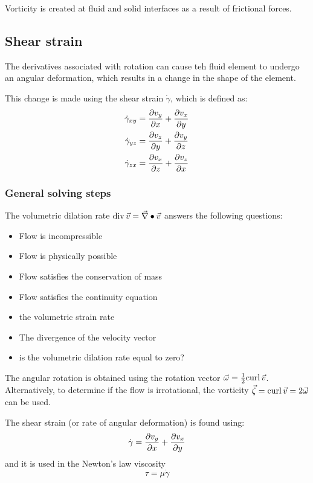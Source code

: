 \documentclass[10pt, twocolumn]{article}
\begin{document}
\begin{remark}
  Vorticity is created at fluid and solid interfaces as a result of frictional forces.
\end{remark}


\subsection{Shear strain}
The derivatives associated with rotation can cause teh fluid element to undergo an angular deformation, which results in a change in the shape of the element.

This change is made using the shear strain \(\dot{\gamma}\), which is defined as:
\begin{align*}
  \dot{\gamma}_{xy} & = \frac{\partial v_y}{\partial x} + \frac{\partial v_x}{\partial y} \\
  \dot{\gamma}_{yz} & = \frac{\partial v_z}{\partial y} + \frac{\partial v_y}{\partial z} \\
  \dot{\gamma}_{zx} & = \frac{\partial v_x}{\partial z} + \frac{\partial v_z}{\partial x}
\end{align*}


\subsubsection{General solving steps}
The volumetric dilation rate \(\mathrm{div}\,\vec{v} = \vec{\nabla} \bullet \vec{v}\) answers the following questions:
\begin{itemize}
  \item Flow is incompressible
  \item Flow is physically possible
  \item Flow satisfies the conservation of mass
  \item Flow satisfies the continuity equation
  \item the volumetric strain rate
  \item The divergence of the velocity vector
  \item is the volumetric dilation rate equal to zero?
\end{itemize}

The angular rotation is obtained using the rotation vector \(\vec{\omega} = \frac{1}{2} \mathrm{curl}\,\vec{v}\).
Alternatively, to determine if the flow is irrotational, the vorticity \(\vec{\zeta} = \mathrm{curl}\,\vec{v} = 2 \vec{\omega}\) can be used.

The shear strain (or rate of angular deformation) is found using:
\[
  \dot{\gamma} = \frac{\partial v_y}{\partial x} + \frac{\partial v_x}{\partial y}
\]
and it is used in the Newton's law viscosity
\[
  \tau = \mu \dot{\gamma}
\]
\end{document}
